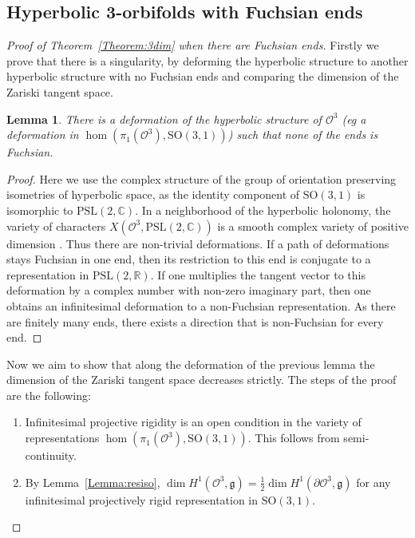 \documentclass[a4paper,11pt]{article}
\newtheorem{Lemma}[Theorem]{Lemma}
\begin{document}
\subsection{Hyperbolic 3-orbifolds with Fuchsian ends}




\begin{proof}[Proof of Theorem~\ref{Theorem:3dim}
 when there are Fuchsian ends]

Firstly  we prove that there is a singularity, by deforming the hyperbolic structure to another hyperbolic structure with
no Fuchsian ends and comparing the dimension of the Zariski tangent space.


\begin{Lemma}
\label{Lemma:NFD}
There is a deformation of the hyperbolic structure of $\mathcal O^3$ (eg a deformation in $\hom(\pi_1(\mathcal O^3),\mathrm{SO}(3,1))$)
 such that none of the ends is Fuchsian.
 \end{Lemma}

\begin{proof}
Here we use 
the complex structure of the group of orientation preserving
isometries of hyperbolic space, as the identity component of $\mathrm{SO}(3,1)$ is isomorphic to $\mathrm{PSL}(2,\mathbb C)$.
In a neighborhood of the hyperbolic holonomy,
the variety of characters
$X(\mathcal O^3,\mathrm{PSL}(2,\mathbb C))$
is a smooth complex variety of positive dimension
\cite[Section~8.8]{KapovichBook}. Thus there are non-trivial deformations.
If a path of deformations stays Fuchsian in one end,
then its restriction to this end is conjugate to a
representation in  $\mathrm{PSL}(2,\mathbb R)$.
If one multiplies the tangent vector to this deformation 
by a complex number with non-zero imaginary part, then one obtains an infinitesimal deformation to a non-Fuchsian representation. 
As there are finitely many ends, there exists a direction
that is non-Fuchsian for every end.
\end{proof}



Now we aim to show that along the deformation of the previous lemma the dimension of the Zariski tangent space decreases strictly. The steps of the proof are the following:
\begin{enumerate}[(1)]
 \item Infinitesimal projective rigidity is an open condition
 in the variety of representations $\hom(\pi_1(\mathcal O^3),\mathrm{SO}(3,1))$. This follows from semi-continuity. 
 \item  By Lemma~\ref{Lemma:resiso}, $\dim H^1(\mathcal O^3,\mathfrak g)=\frac12 \dim H^1(\partial\mathcal O^3,\mathfrak g)$
 for any infinitesimal projectively rigid representation in 
 $\mathrm{SO}(3,1)$.
 

\end{enumerate}
\end{proof}
\end{document}
